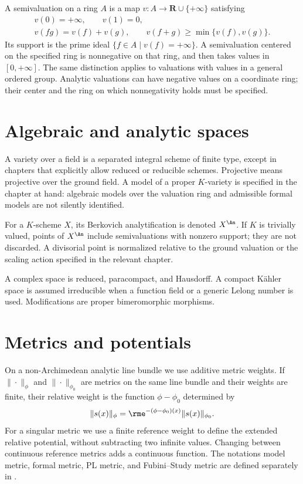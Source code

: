 A semivaluation on a ring \(A\) is a map
\(v:A\to\mathbf R\cup\{+\infty\}\) satisfying
\[
 \begin{gathered}
 v(0)=+\infty,\qquad v(1)=0,\\
 v(fg)=v(f)+v(g),\qquad
 v(f+g)\ge\min\{v(f),v(g)\}.
 \end{gathered}
\]
Its support is the prime ideal
\(\{f\in A\mid v(f)=+\infty\}\). A semivaluation centered on the specified
ring is nonnegative on that ring, and then takes values in
\([0,+\infty]\). The same distinction applies to valuations with values
in a general ordered group. Analytic valuations can have negative values
on a coordinate ring; their center and the ring on which nonnegativity
holds must be specified.

\section*{Algebraic and analytic spaces}
\label{front:conventions-spaces}

A variety over a field is a separated integral scheme of finite type, except
in chapters that explicitly allow reduced or reducible schemes.  Projective
means projective over the ground field.  A model of a proper \(K\)-variety is
specified in the chapter at hand: algebraic models over the valuation ring
and admissible formal models are not silently identified.

For a \(K\)-scheme \(X\), its Berkovich analytification is denoted
\(X^{\An}\).  If \(K\) is trivially valued, points of \(X^{\An}\) include
semivaluations with nonzero support; they are not discarded.  A divisorial
point is normalized relative to the ground valuation or the scaling action
specified in the relevant chapter.

A complex space is reduced, paracompact, and Hausdorff.  A compact Kähler
space is assumed irreducible when a function field or a generic Lelong number
is used.  Modifications are proper bimeromorphic morphisms.

\section*{Metrics and potentials}
\label{front:conventions-metrics}

On a non-Archimedean analytic line bundle we use additive metric weights.  If
\(\|\cdot\|_\phi\) and \(\|\cdot\|_{\phi_0}\) are metrics on the same line
bundle and their weights are finite, their relative weight is the function
\(\phi-\phi_0\) determined by
\[
  \|s(x)\|_\phi=\rme^{-(\phi-\phi_0)(x)}\|s(x)\|_{\phi_0}.
\]
For a singular metric we use a finite reference weight to define the
extended relative potential, without subtracting two infinite values.
Changing between continuous reference metrics adds a continuous function. The
notations model metric, formal metric, PL metric, and Fubini--Study metric are
defined separately in .

